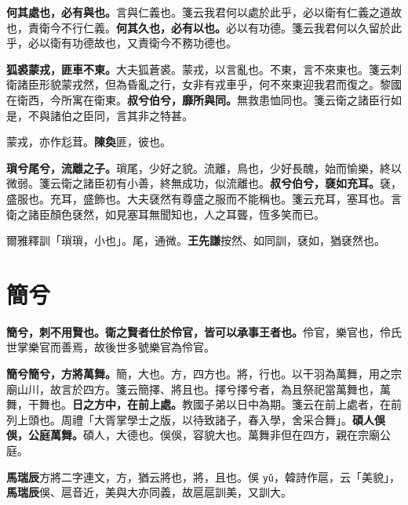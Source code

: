 \textbf{何其處也，必有與也。}{\footnotesize 言與仁義也。箋云我君何以處於此乎，必以衛有仁義之道故也，責衛今不行仁義。}\textbf{何其久也，必有以也。}{\footnotesize 必以有功德。箋云我君何以久留於此乎，必以衛有功德故也，又責衛今不務功德也。}

\textbf{狐裘蒙戎，匪車不東。}{\footnotesize 大夫狐蒼裘。蒙戎，以言亂也。不東，言不來東也。箋云刺衛諸臣形貌蒙戎然，但為昏亂之行，女非有戎車乎，何不來東迎我君而復之。黎國在衛西，今所寓在衛東。}\textbf{叔兮伯兮，靡所與同。}{\footnotesize 無救患恤同也。箋云衛之諸臣行如是，不與諸伯之臣同，言其非之特甚。}

\begin{quoting}蒙戎，亦作尨茸。\textbf{陳奐}匪，彼也。\end{quoting}

\textbf{瑣兮尾兮，流離之子。}{\footnotesize 瑣尾，少好之貌。流離，鳥也，少好長醜，始而愉樂，終以微弱。箋云衛之諸臣初有小善，終無成功，似流離也。}\textbf{叔兮伯兮，褎如充耳。}{\footnotesize 褎，盛服也。充耳，盛飾也。大夫褎然有尊盛之服而不能稱也。箋云充耳，塞耳也。言衛之諸臣顏色褎然，如見塞耳無聞知也，人之耳聾，恆多笑而已。}

\begin{quoting}爾雅釋訓「瑣瑣，小也」。尾，通微。\textbf{王先謙}按然、如同訓，褎如，猶褎然也。\end{quoting}

\section{簡兮}


\textbf{簡兮，刺不用賢也。衛之賢者仕於伶官，皆可以承事王者也。}{\footnotesize 伶官，樂官也，伶氏世掌樂官而善焉，故後世多號樂官為伶官。}

\textbf{簡兮簡兮，方將萬舞。}{\footnotesize 簡，大也。方，四方也。將，行也。以干羽為萬舞，用之宗廟山川，故言於四方。箋云簡擇、將且也。擇兮擇兮者，為且祭祀當萬舞也，萬舞，干舞也。}\textbf{日之方中，在前上處。}{\footnotesize 教國子弟以日中為期。箋云在前上處者，在前列上頭也。周禮「大胥掌學士之版，以待致諸子，春入學，舍采合舞」。}\textbf{碩人俁俁，公庭萬舞。}{\footnotesize 碩人，大德也。俁俁，容貌大也。萬舞非但在四方，親在宗廟公庭。}

\begin{quoting}\textbf{馬瑞辰}方將二字連文，方，猶云將也，將，且也。俁 \texttt{yǔ}，韓詩作扈，云「美貌」，\textbf{馬瑞辰}俁、扈音近，美與大亦同義，故扈扈訓美，又訓大。\end{quoting}

